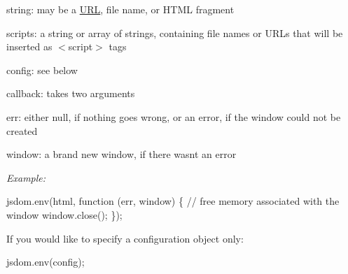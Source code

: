 \begin{DoxyItemize}
\item {\ttfamily string}\+: may be a \mbox{\hyperlink{namespace_u_r_l}{U\+RL}}, file name, or H\+T\+ML fragment
\item {\ttfamily scripts}\+: a string or array of strings, containing file names or U\+R\+Ls that will be inserted as {\ttfamily $<$script$>$} tags
\item {\ttfamily config}\+: see below
\item {\ttfamily callback}\+: takes two arguments
\begin{DoxyItemize}
\item {\ttfamily err}\+: either {\ttfamily null}, if nothing goes wrong, or an error, if the window could not be created
\item {\ttfamily window}\+: a brand new {\ttfamily window}, if there wasn\textquotesingle{}t an error
\end{DoxyItemize}
\end{DoxyItemize}

{\itshape Example\+:}


\begin{DoxyCode}
jsdom.env(html, function (err, window) \{
  // free memory associated with the window
  window.close();
\});
\end{DoxyCode}


If you would like to specify a configuration object only\+:


\begin{DoxyCode}
jsdom.env(config);
\end{DoxyCode}



